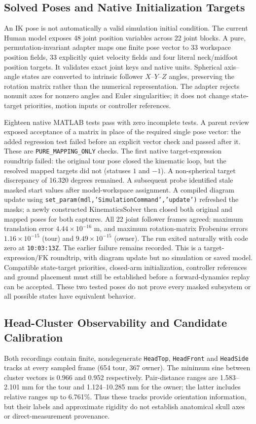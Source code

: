 \documentclass[11pt,a4paper]{article}
\begin{document}
\subsection{Solved Poses and Native Initialization Targets}
An IK pose is not automatically a valid simulation initial condition. The
current Human model exposes 48 joint position variables across 22 joint
blocks. A pure, permutation-invariant adapter maps one finite pose vector
to 33 workspace position fields, 33 explicitly quiet velocity fields and
four literal neck/midfoot position targets. It validates exact joint keys
and native units. Spherical axis--angle states are converted to intrinsic
follower $X$--$Y$--$Z$ angles, preserving the rotation matrix rather than
the numerical representation\cite{MathWorksEuler}. The adapter rejects
nonunit axes for nonzero angles and Euler singularities; it does not
change state-target priorities, motion inputs or controller references.

Eighteen native MATLAB tests pass with zero incomplete tests. A parent
review exposed acceptance of a matrix in place of the required single pose
vector: the added regression test failed before an explicit vector check
and passed after it. These are \texttt{PURE\_MAPPING\_ONLY} checks. The
first native target-expression roundtrip failed: the original tour pose
closed the kinematic loop, but the resolved mapped targets did not
(statuses $1$ and $-1$). A non-spherical target discrepancy of 16.320
degrees remained. A subsequent probe identified stale masked start values
after model-workspace assignment. A compiled diagram update using
\texttt{set\_param(mdl,'SimulationCommand','update')} refreshed the masks;
a newly constructed KinematicsSolver then closed both original and mapped
poses for both captures. All 22 joint follower frames agreed: maximum
translation error $4.44\times10^{-16}$ m, and maximum rotation-matrix
Frobenius errors $1.16\times10^{-15}$ (tour) and $9.49\times10^{-15}$ (owner).
The run exited naturally with code zero at \texttt{10:03:13Z}. The earlier
failure remains recorded. This is a target-expression/FK roundtrip, with
diagram update but no simulation or saved model. Compatible state-target
priorities, closed-arm initialization, controller references and ground
placement must still be established before a forward-dynamics replay can
be accepted. These two tested poses do not prove every masked subsystem
or all possible states have equivalent behavior.

\subsection{Head-Cluster Observability and Candidate Calibration}
Both recordings contain finite, nondegenerate \texttt{HeadTop},
\texttt{HeadFront} and \texttt{HeadSide} tracks at every sampled frame
(654 tour, 367 owner). The minimum sine between cluster vectors is
0.966 and 0.952 respectively. Pair-distance ranges are 1.583--2.101 mm
for the tour and 1.124--10.285 mm for the owner; the latter includes
relative ranges up to 6.761\%. Thus these tracks provide orientation
information, but their labels and approximate rigidity do not establish
anatomical skull axes or direct-measurement provenance.
\end{document}
